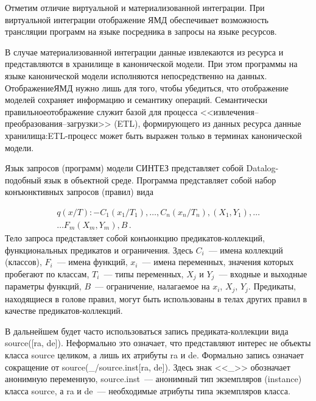 \begin{multicols}{2}
        Отметим отличие виртуальной и материализованной интеграции. При 
виртуальной интеграции отображение ЯМД обеспечивает возможность 
трансляции программ на языке посредника в запросы на языке ресурсов. 
        
        В случае материализованной интеграции данные извлекаются из ресурса 
и представляются в хранилище в канонической модели. При этом программы 
на языке канонической модели исполняются непосредственно на данных. 
Отоб\-ра\-же\-ние\linebreak ЯМД нужно лишь для того, чтобы убедиться, что отображение 
моделей сохраняет информацию и семантику операций. Семантически 
правильное\linebreak отоб\-ра\-же\-ние служит базой для процесса 
        <<из\-вле\-че\-ния--пре\-образо\-ва\-ния--за\-груз\-ки>> (ETL), 
формирующего из данных ресурса данные хранилища:\linebreak ETL-про\-цесс может 
быть выражен только в терминах канонической модели.
        
        \smallskip
        
        Язык запросов (программ) модели СИНТЕЗ представляет собой 
        Datalog-по\-доб\-ный язык в объектной среде. Программа представляет 
собой набор конъюнктивных запросов (правил) вида 

\noindent
\begin{multline*}
        q(x/T): - C_1(x_1/T_1),\ldots , C_n(x_n/T_n), (X_1,Y_1), 
\ldots \\
\ldots F_m(X_m,Y_m), B\,.
        \end{multline*}
        Тело запроса представляет собой конъюнкцию 
        пре\-ди\-ка\-тов-кол\-лек\-ций, функциональных предикатов и 
ограничения. Здесь $C_i$~--- имена коллекций (классов), $F_i$~--- имена 
функций, $x_i$~--- имена переменных, значения которых пробегают по 
классам, $T_i$~--- типы переменных, $X_j$ и $Y_j$~--- входные и выходные 
параметры функций, $B$~--- ограничение, налагаемое на $x_i$, $X_j$, $Y_j$. 
Предикаты, находящиеся в голове правил, могут быть использованы в телах 
других правил в качестве пре\-ди\-ка\-тов-кол\-лек\-ций. 
        
        В дальнейшем будет часто использоваться запись 
        пре\-ди\-ка\-та-кол\-лек\-ции вида {\sf source([ra, de])}. Неформально это 
означает, что представляют интерес не объекты класса {\sf source} целиком, а 
лишь их атрибуты {\sf ra} и {\sf de}. Формально запись означает сокращение от 
{\sf source(\_/source.inst[ra, de])}. Здесь знак <<{\sf \_}>> обозначает анонимную 
переменную, {\sf source.inst}~--- анонимный тип экземпляров (instance) класса 
{\sf source}, а {\sf ra} и {\sf de}~--- необходимые атрибуты типа экземпляров класса.
        

\end{multicols}

